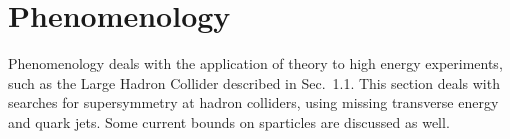 \documentclass[twoside,english]{uiofysmaster}
\begin{document}
{\section{Phenomenology}

Phenomenology deals with the application of theory to high energy experiments, such as the Large Hadron Collider described in Sec.\ 1.1. This section deals with searches for supersymmetry at hadron colliders, using missing transverse energy and quark jets. Some current bounds on sparticles are discussed as well.

}
\end{document}
